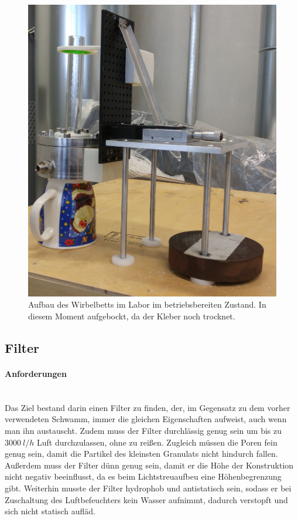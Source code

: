 \begin{figure}[h!]
	\begin{center}
		\includegraphics[scale=0.13]{Laboraufbau.jpg}
		\caption[Laboraufbau Wirbelbett]{Aufbau des Wirbelbetts im Labor im betriebsbereiten Zustand. In diesem Moment aufgebockt, da der Kleber noch trocknet.}
	\end{center}
\end{figure}


\newpage

\subsection{Filter}

\paragraph{Anforderungen}
\hfill \\
Das Ziel bestand darin einen Filter zu finden, der, im Gegensatz zu dem vorher verwendeten Schwamm, immer die gleichen Eigenschaften aufweist, auch wenn man ihn austauscht. Zudem muss der Filter durchlässig genug sein um bis zu $\SI{3000}{l/h}$ Luft durchzulassen, ohne zu reißen. Zugleich müssen die Poren fein genug sein, damit die Partikel des kleinsten Granulats nicht hindurch fallen. Außerdem muss der Filter dünn genug sein, damit er die Höhe der Konstruktion nicht negativ beeinflusst, da es beim Lichtstreuaufbeu eine Höhenbegrenzung gibt. Weiterhin musste der Filter hydrophob und antistatisch sein, sodass er bei Zuschaltung des Luftbefeuchters kein Wasser aufnimmt, dadurch verstopft und sich nicht statisch aufläd.


